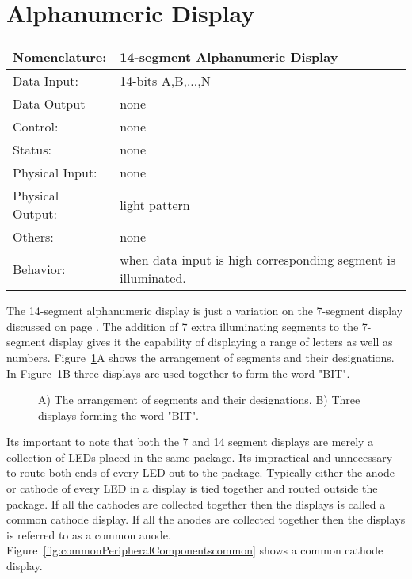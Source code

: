 \section{Alphanumeric Display}
\label{page:alpha}
\begin{tabular}{|l|p{3.5in}|} \hline
Nomenclature:  & 14-segment Alphanumeric Display  \\ \hline
Data Input:    & 14-bits A,B,...,N     \\ \hline
Data Output    & none    \\ \hline
Control:       & none           \\ \hline
Status:        & none                                   \\ \hline
Physical Input:& none		\\ \hline
Physical Output:& light pattern		\\ \hline
Others:        & none                   \\ \hline
Behavior:      & when data input is high corresponding segment 
is illuminated. \\ \hline
\end{tabular}

The 14-segment alphanumeric display is just a variation on the
7-segment display discussed on page \pageref{page:7seg}.  The addition
of 7 extra illuminating segments to the 7-segment display gives
it the capability of displaying a range of letters as well as
numbers.  Figure~\ref{fig:commonPeripheralComponentsalpha}A shows the arrangement of segments
and their designations.  In Figure~\ref{fig:commonPeripheralComponentsalpha}B three displays
are used together to form the word "BIT".

\begin{figure}[ht]
\caption{A) The arrangement of segments and their designations.  B) Three
displays forming the word "BIT".}
\label{fig:commonPeripheralComponentsalpha}
\end{figure}

Its important to note that both the 7 and 14 segment displays are
merely a collection of LEDs placed in the same package.  Its impractical 
and unnecessary to route both ends of every LED out to the package.
Typically either the anode or cathode of every LED in a display is 
tied together
and routed outside the package.  If all the cathodes are collected
together then the displays is called a common cathode display.  If
all the anodes are collected together then the displays is referred
to as a common anode.  Figure~\ref{fig:commonPeripheralComponentscommon} shows a common
cathode display.

